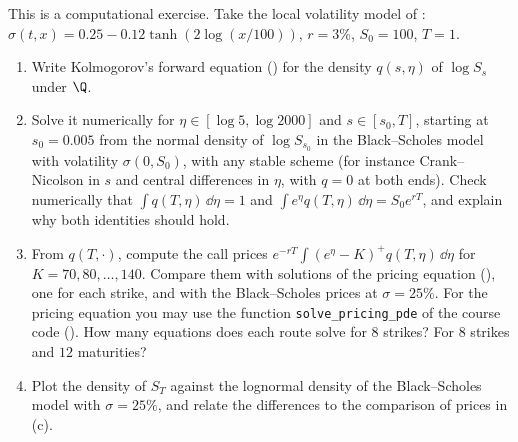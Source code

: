 \begin{exercise}\label{ex:fk-forward-pde}
\hard This is a computational exercise. Take the local volatility model of
: $\sigma(t,x)=0.25-0.12\tanh(2\log(x/100))$, $r=3\%$, $S_0=100$, $T=1$.
\begin{enumerate}[label=(\alph*)]
  \item Write Kolmogorov's forward equation () for the density
    $q(s,\eta)$ of $\log S_s$ under $\Q$.
  \item Solve it numerically for $\eta\in[\log5,\log2000]$ and $s\in[s_0,T]$, starting at $s_0=0.005$
    from the normal density of $\log S_{s_0}$ in the Black--Scholes model with volatility
    $\sigma(0,S_0)$, with any stable scheme (for instance Crank--Nicolson in $s$ and central
    differences in $\eta$, with $q=0$ at both ends). Check numerically that $\int q(T,\eta)\,\dd\eta=1$
    and $\int e^\eta q(T,\eta)\,\dd\eta=S_0e^{rT}$, and explain why both identities should hold.
  \item From $q(T,\cdot)$, compute the call prices $e^{-rT}\int(e^\eta-K)^+q(T,\eta)\,\dd\eta$ for
    $K=70,80,\dots,140$. Compare them with solutions of the pricing equation
    (), one for each strike, and with the Black--Scholes prices at
    $\sigma=25\%$. For the pricing equation you may use the function
    \texttt{solve\_pricing\_pde} of the course code (). How many equations does each route solve for $8$ strikes?
    For $8$ strikes and $12$ maturities?
  \item Plot the density of $S_T$ against the lognormal density of the Black--Scholes model with
    $\sigma=25\%$, and relate the differences to the comparison of prices in (c).
\end{enumerate}
\end{exercise}
